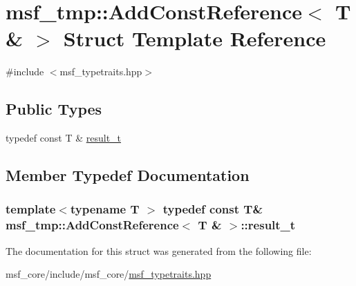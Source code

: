 \hypertarget{structmsf__tmp_1_1AddConstReference_3_01T_01_6_01_4}{\section{msf\-\_\-tmp\-:\-:Add\-Const\-Reference$<$ T \& $>$ Struct Template Reference}
\label{structmsf__tmp_1_1AddConstReference_3_01T_01_6_01_4}
}


{\ttfamily \#include $<$msf\-\_\-typetraits.\-hpp$>$}

\subsection*{Public Types}
\begin{DoxyCompactItemize}
\item 
typedef const T \& \hyperlink{structmsf__tmp_1_1AddConstReference_3_01T_01_6_01_4_a93ed39fb491234523b8ca98e93ab2ed4}{result\-\_\-t}
\end{DoxyCompactItemize}


\subsection{Member Typedef Documentation}
\hypertarget{structmsf__tmp_1_1AddConstReference_3_01T_01_6_01_4_a93ed39fb491234523b8ca98e93ab2ed4}{
\subsubsection[{result\-\_\-t}]{\setlength{\rightskip}{0pt plus 5cm}template$<$typename T $>$ typedef const T\& {\bf msf\-\_\-tmp\-::\-Add\-Const\-Reference}$<$ T \& $>$\-::{\bf result\-\_\-t}}}\label{structmsf__tmp_1_1AddConstReference_3_01T_01_6_01_4_a93ed39fb491234523b8ca98e93ab2ed4}


The documentation for this struct was generated from the following file\-:\begin{DoxyCompactItemize}
\item 
msf\-\_\-core/include/msf\-\_\-core/\hyperlink{msf__typetraits_8hpp}{msf\-\_\-typetraits.\-hpp}\end{DoxyCompactItemize}

